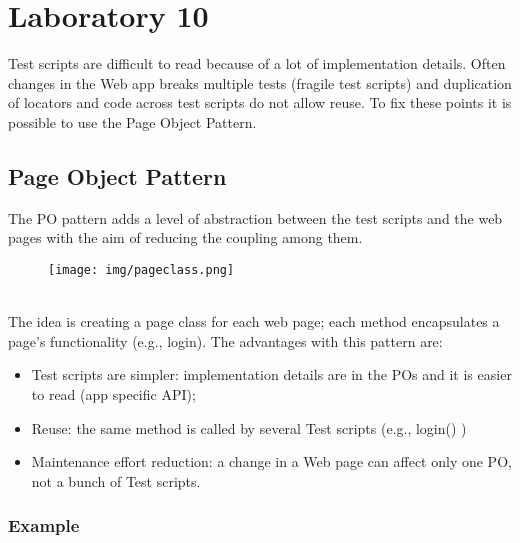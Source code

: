 \documentclass[a4paper, 10pt, titlepage]{article}
\begin{document}
\newpage
\section{Laboratory 10}
Test scripts are difficult to read because of a lot of implementation details. Often changes in the Web app breaks multiple tests (fragile test scripts) and duplication of locators and code across test scripts do not allow reuse. To fix these points it is possible to use the Page Object Pattern.


\subsection*{Page Object Pattern}
The PO pattern adds a level of abstraction between the test scripts and the web pages with the aim of reducing the coupling among them.
\begin{figure}[h]
\centering
\texttt{[image: img/pageclass.png]}
\end{figure}\\
The idea is creating a page class for each web page; each method encapsulates a page’s functionality (e.g., login). The advantages with this pattern are:
\begin{itemize}
\item Test scripts are simpler: implementation details are in
the POs and it is easier to read (app specific API);
\item Reuse: the same method is called by several Test scripts (e.g., login() )
\item Maintenance effort reduction: a change in a Web page can affect only one PO, not a bunch of Test scripts.
\end{itemize}

\subsubsection*{Example}
\end{document}
